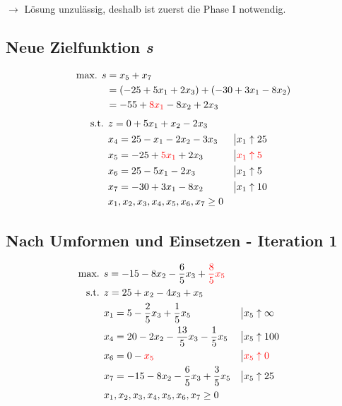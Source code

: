 \documentclass[a4paper,11pt]{article}
\begin{document}
$\to$ Lösung unzulässig, deshalb ist zuerst die Phase I notwendig. \\

\subsection*{Neue Zielfunktion \emph{s}}
\begin{align*}
\text{max. } s &= x_5 + x_7 \\
&= (-25 + 5x_1 + 2x_3) + (-30 + 3x_1 - 8x_2) \\
&= -55 + {\color{red} 8x_1} - 8x_2 + 2x_3
\end{align*}
\begin{align*}
\text{s.t. } & z = 0 + 5x_1 + x_2 - 2x_3 \\
& x_4 = 25 - x_1 - 2x_2 - 3x_3 &&\big| x_1 \uparrow 25 \\
& x_5 = -25 + {\color{red} 5x_1} + 2x_3 &&\big| \color{red} x_1 \uparrow 5 \\
& x_6 = 25 - 5x_1 - 2x_3 &&\big| x_1 \uparrow 5 \\
& x_7 = -30 + 3x_1 - 8x_2 &&\big| x_1 \uparrow 10 \\
& x_1, x_2, x_3, x_4, x_5, x_6, x_7 \ge 0
\end{align*}

\subsection*{Nach Umformen und Einsetzen - Iteration 1}
\begin{align*}
\text{max. } & s = -15 - 8x_2 - \frac{6}{5}x_3 + {\color{red} \frac{8}{5}x_5}\\
\text{s.t. } & z = 25 + x_2 - 4x_3 +x_5 \\
& x_1 = 5 - \frac{2}{5}x_3 + \frac{1}{5}x_5 &&\big| x_5 \uparrow \infty \\
& x_4 = 20 - 2x_2 - \frac{13}{5}x_3 - \frac{1}{5}x_5 &&\big| x_5 \uparrow 100 \\
& x_6 = 0 - {\color{red} x_5} &&\big| \color{red} x_5 \uparrow 0 \\
& x_7 = -15 - 8x_2 - \frac{6}{5}x_3 + \frac{3}{5}x_5 &&\big| x_5 \uparrow 25 \\
& x_1, x_2, x_3, x_4, x_5, x_6, x_7 \ge 0
\end{align*}
\end{document}
